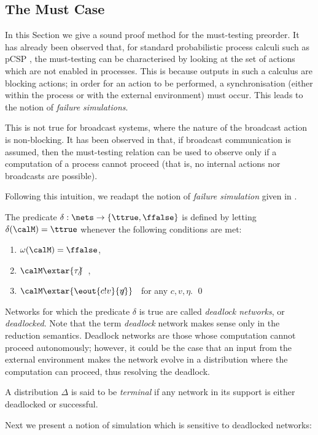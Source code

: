\documentclass{LMCS}
\begin{document}
\subsection{The Must Case}
\label{sec:must.sound}
In this Section we give a sound proof method for the must-testing 
preorder. It has already been observed that, for standard 
probabilistic process calculi such as pCSP \cite{DGHM09full}, 
the must-testing can be characterised by looking at the 
set of actions which are not enabled in processes. 
This is because outputs in such a calculus are blocking 
actions; in order for an action to be performed, a synchronisation 
(either within the process or with the external environment) 
must occur. This leads to the notion of \emph{failure simulations}.

This is not true for broadcast systems, where the nature of 
the broadcast action is non-blocking. It has been observed 
in \cite{Ene02} that, if broadcast communication is assumed, 
then the must-testing relation can be used to observe only if  
a computation of a process cannot proceed (that is, no 
internal actions nor broadcasts are possible). 

Following this intuition, we readapt the notion of \emph{failure 
simulation} given in \cite{DGHM09full}. 
\begin{defi}
\label{def:deadlock}
The predicate $\delta : \nets \rightarrow \{\ttrue, \ffalse\}$ 
is defined by letting $\delta(\calM) = \ttrue$ whenever the 
following conditions are met:
\begin{enumerate}[label=(\roman*)]
\item $\omega(\calM) = \ffalse$,
\item $\calM \extar{\tau}\hspace{-10pt}\not\;\hspace{10pt}$,
\item $\calM \extar{\eout{c!v}{\eta}}\hspace{-18pt}\not\;\hspace{18pt}$ 
for any $c,v, \eta$. \qed
\end{enumerate}
\noindent
Networks for which the predicate $\delta$ is true 
are called \emph{deadlock networks}, or \emph{deadlocked}. 
Note that the term \emph{deadlock} network makes sense only 
in the reduction semantics. Deadlock networks 
are those whose  computation cannot proceed 
autonomously; however, it could be the case that an 
input from the external environment makes the network 
evolve in a distribution where the computation can 
proceed, thus resolving the deadlock.

A distribution $\Delta$ is said to be \emph{terminal} if 
any network in its support is either deadlocked or 
successful.
\end{defi}
\noindent
Next we present a notion of simulation which is sensitive 
to deadlocked networks:
\end{document}

